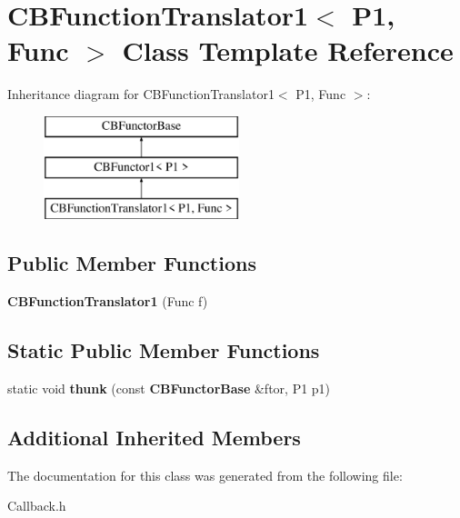 \section{C\+B\+Function\+Translator1$<$ P1, Func $>$ Class Template Reference}
\label{classCBFunctionTranslator1}
Inheritance diagram for C\+B\+Function\+Translator1$<$ P1, Func $>$\+:\begin{figure}[H]
\begin{center}
\leavevmode
\includegraphics[height=3.000000cm]{classCBFunctionTranslator1}
\end{center}
\end{figure}
\subsection*{Public Member Functions}
\begin{DoxyCompactItemize}
\item 
{\bfseries C\+B\+Function\+Translator1} (Func f)\label{classCBFunctionTranslator1_ac72c06da799c65a37195218a5c800e12}

\end{DoxyCompactItemize}
\subsection*{Static Public Member Functions}
\begin{DoxyCompactItemize}
\item 
static void {\bfseries thunk} (const {\bf C\+B\+Functor\+Base} \&ftor, P1 p1)\label{classCBFunctionTranslator1_a7d85f4a12350666a798e1895afd5740c}

\end{DoxyCompactItemize}
\subsection*{Additional Inherited Members}


The documentation for this class was generated from the following file\+:\begin{DoxyCompactItemize}
\item 
Callback.\+h\end{DoxyCompactItemize}
